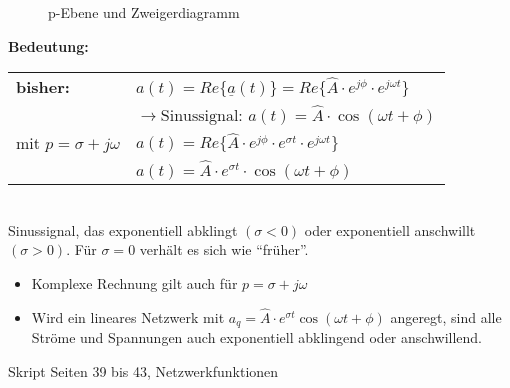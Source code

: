 \begin{figure}[htp]
\centering
  \subfloat[p-Ebene]{
  	\label{fig:ElNetzw:pEbene}
  	
  }
  \qquad
  \subfloat[Zeiger]{
    \label{fig:ElNetzw:ZeigerDiag}
    
  }
  \caption[p-Ebene und Zweigerdiagramm]{p-Ebene und Zweigerdiagramm}
  \label{fig:ElNetzw:pEbeneZeigerDiag}
\end{figure}

\textbf{Bedeutung:}\\
\begin{tabular}{ll}
	\textbf{bisher:} & $a(t)=Re\{\underline{a}(t)\}=Re\{\hat{A}\cdot e^{j\phi}\cdot
	e^{j\omega t}\}$ \\
	& $\rightarrow \text{Sinussignal: } a(t)=\hat{A}\cdot\cos{\left(\omega t +
	\phi\right)}$\\ mit $p=\sigma+j\omega$ & $a(t)=Re\{\hat{A}\cdot e^{j\phi}\cdot
	e^{\sigma t}\cdot e^{j\omega t}\}$\\
	& $a(t)=\hat{A}\cdot e^{\sigma t} \cdot \cos{\left(\omega t + \phi\right)}$\\
\end{tabular}\\
Sinussignal, das exponentiell abklingt $(\sigma < 0)$ oder exponentiell
anschwillt $(\sigma > 0)$. Für $\sigma = 0$ verhält es sich wie "`früher"'.\\
\begin{itemize}
  \item Komplexe Rechnung gilt auch für $p=\sigma+j\omega$\\
  \item Wird ein lineares Netzwerk mit $a_q=\hat{A}\cdot e^{\sigma t}
  \cos\left(\omega t + \phi\right)$ angeregt, sind alle Ströme und Spannungen
  auch exponentiell abklingend oder anschwillend.
\end{itemize}
Skript Seiten 39 bis 43, Netzwerkfunktionen

